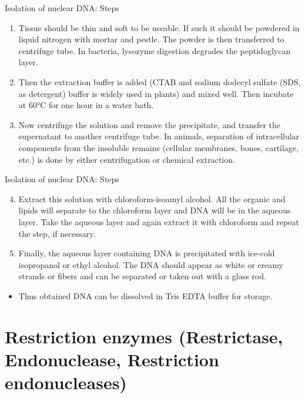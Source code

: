 \documentclass[11pt,dvipsnames,ignorenonframetext,aspectratio=169]{beamer}
\providecommand{\tightlist}{%
  \setlength{\itemsep}{0pt}\setlength{\parskip}{0pt}}
\begin{document}
\begin{frame}{Isolation of nuclear DNA: Steps}
\protect\hypertarget{isolation-of-nuclear-dna-steps}{}
\begin{enumerate}
\tightlist
\item
  Tissue should be thin and soft to be useable. If such it should be
  powdered in liquid nitrogen with mortar and pestle. The powder is then
  transferred to centrifuge tube. In bacteria, lysozyme digestion
  degrades the peptidoglycan layer.
\item
  Then the extraction buffer is added (CTAB and sodium dodecyl sulfate
  (SDS, as detergent) buffer is widely used in plants) and mixed well.
  Then incubate at 60°C for one hour in a water bath.
\item
  Now centrifuge the solution and remove the precipitate, and transfer
  the supernatant to another centrifuge tube. In animals, separation of
  intracellular components from the insoluble remains (cellular
  membranes, bones, cartilage, etc.) is done by either centrifugation or
  chemical extraction.
\end{enumerate}
\end{frame}

\begin{frame}{Isolation of nuclear DNA: Steps}
\protect\hypertarget{isolation-of-nuclear-dna-steps-1}{}
\begin{enumerate}
\setcounter{enumi}{3}
\tightlist
\item
  Extract this solution with chloroform-isoamyl alcohol. All the organic
  and lipids will separate to the chloroform layer and DNA will be in
  the aqueous layer. Take the aqueous layer and again extract it with
  chloroform and repeat the step, if necessary.
\item
  Finally, the aqueous layer containing DNA is precipitated with
  ice-cold isopropanol or ethyl alcohol. The DNA should appear as white
  or creamy strands or fibers and can be separated or taken out with a
  glass rod.
\end{enumerate}

\begin{itemize}
\tightlist
\item
  Thus obtained DNA can be dissolved in Tris EDTA buffer for storage.
\end{itemize}
\end{frame}

\hypertarget{restriction-enzymes-restrictase-endonuclease-restriction-endonucleases}{%
\section{Restriction enzymes (Restrictase, Endonuclease, Restriction
endonucleases)}\label{restriction-enzymes-restrictase-endonuclease-restriction-endonucleases}}
\end{document}
